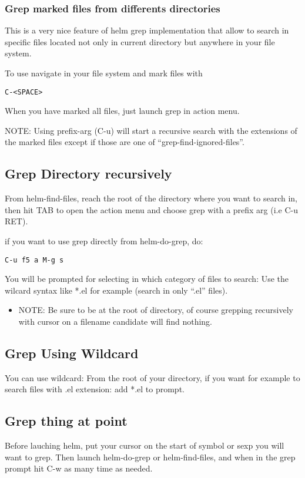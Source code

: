 \documentclass[a4paper,11pt]{article}
\begin{document}
\subsubsection{Grep marked files from differents directories}
\label{sec:grep-marked-files-1}
This is a very nice feature of helm grep implementation that allow to search in specific files located not
only in current directory but anywhere in your file system.

To use navigate in your file system and mark files with 
\begin{verbatim}
C-<SPACE> 
\end{verbatim}
When you have marked all files, just launch grep in action menu.

NOTE: Using prefix-arg (C-u) will start a recursive search with the extensions of the marked files
except if those are one of ``grep-find-ignored-files''.  

\subsection{Grep Directory recursively}
\label{sec:grep-direct-recurs}
From helm-find-files, reach the root of the directory where you want to search in,
then hit TAB to open the action menu and choose grep with a prefix arg (i.e C-u RET).

if you want to use grep directly from helm-do-grep, do:

\begin{verbatim}
C-u f5 a M-g s
\end{verbatim}

You will be prompted for selecting in which category of files to search:
Use the wilcard syntax like *.el for example (search in only ``.el'' files).
\\
\begin{itemize}
\item NOTE: Be sure to be at the root of directory, of course grepping recursively with cursor
on a filename candidate will find nothing.

\end{itemize}
\subsection{Grep Using Wildcard}
\label{sec:grep-using-wildcard}
You can use wildcard:
From the root of your directory, if you want for example to search files with .el extension:
add *.el to prompt.

\subsection{Grep thing at point}
\label{sec:grep-thing-at}
Before lauching helm, put your cursor on the start of symbol or sexp you will want to grep.
Then launch helm-do-grep or helm-find-files, and when in the grep prompt hit C-w as many time as needed.
\end{document}
